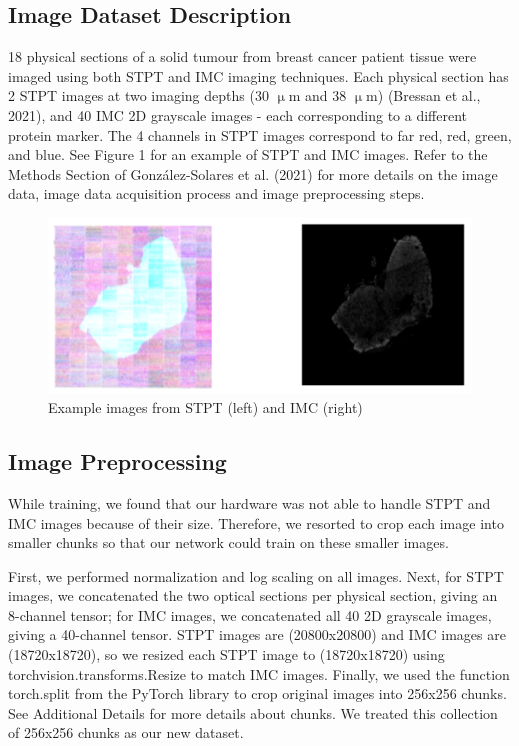 \documentclass[10pt,twocolumn,letterpaper]{article}
\begin{document}
\subsection{Image Dataset Description}

18 physical sections of a solid tumour from breast cancer patient tissue were imaged using both STPT and IMC imaging techniques. Each physical section has 2 STPT  images at two imaging depths (30 $\upmu$m and 38 $\upmu$m) (Bressan et al., 2021), and 40 IMC 2D grayscale images - each corresponding to a different protein marker. The 4 channels in STPT images correspond to far red, red, green, and blue. See Figure 1 for an example of STPT and IMC images. Refer to the Methods Section of González-Solares et al. (2021) for more details on the image data, image data acquisition process and image preprocessing steps. 

\begin{figure}
	\centering
	\captionsetup{justification=centering}
		\hspace*{-0.2cm}	
		\includegraphics[scale=0.35]{../figures/imc_stpt_img4report.png}
	\caption{Example images from STPT (left) and IMC (right)}		
\end{figure}

\subsection{Image Preprocessing}

While training, we found that our hardware was not able to handle STPT and IMC images because of their size. Therefore, we resorted to crop each image into smaller chunks so that our network could train on these smaller images. 

First, we performed normalization and log scaling on all images. Next, for STPT images, we concatenated the two optical sections per physical section, giving an 8-channel tensor; for IMC images, we concatenated all 40 2D grayscale images, giving a 40-channel tensor. STPT images are (20800x20800) and IMC images are (18720x18720), so we resized each STPT image to (18720x18720) using torchvision.transforms.Resize to match IMC images. Finally, we used the function torch.split from the PyTorch library to crop original images into 256x256 chunks. See Additional Details for more details about chunks. We treated this collection of 256x256 chunks as our new dataset. 
\end{document}
